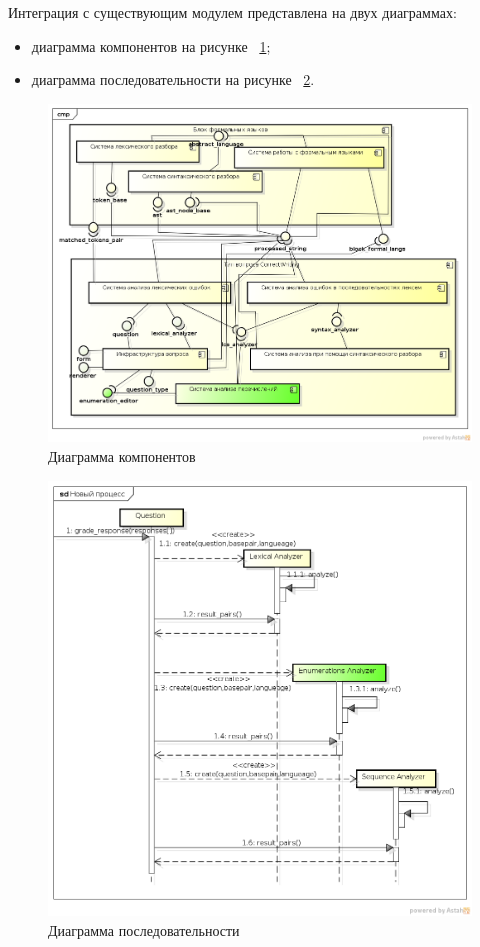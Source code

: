 \documentclass[a4paper,english]{G2-105}
\begin{document}
\newpage
\par Интеграция с существующим модулем представлена на двух диаграммах:
\begin{itemize}
    \item диаграмма компонентов на рисунке ~\ref{component};
    \item диаграмма последовательности на рисунке ~\ref{sequence}.
\end{itemize}
\begin{figure} 
\includegraphics[width = \linewidth]{tzcomponent.png}
\caption{Диаграмма компонентов}\label{component}
\end{figure}
\newpage
\begin{figure} 
\includegraphics[width = \linewidth]{tzsequence.png}
\caption{Диаграмма последовательности}\label{sequence}
\end{figure}
\end{document}
